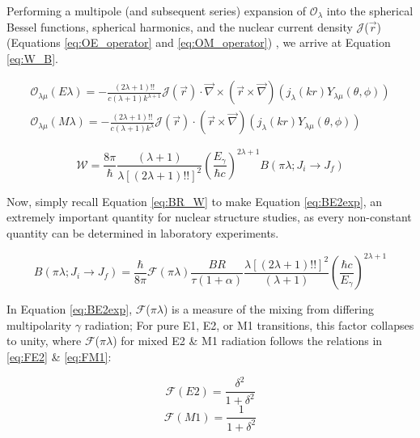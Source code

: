Performing a multipole (and subsequent series) expansion of $\mathcal{O}_{\lambda}$ into the spherical Bessel functions, spherical harmonics, and the nuclear current density $\mathcal{J}$($\vec{r}$) (Equations \ref{eq:OE_operator} and \ref{eq:OM_operator}) \cite{Wong_text}, we arrive at Equation \ref{eq:W_B}.

\begin{align}
  \mathcal{O}_{\lambda\mu}(E\lambda)=-\frac{(2\lambda+1)!!}{c(\lambda+1)k^{\lambda+1}}\mathcal{J}(\vec{r})\cdot\vec{\nabla}\times(\vec{r}\times\vec{\nabla})(j_\lambda(kr)Y_{\lambda\mu}(\theta,\phi))       \label{eq:OE_operator}\\
\mathcal{O}_{\lambda\mu}(M\lambda)=-\frac{(2\lambda+1)!!}{c(\lambda+1)k^{\lambda}}\mathcal{J}(\vec{r})\cdot(\vec{r}\times\vec{\nabla})(j_\lambda(kr)Y_{\lambda\mu}(\theta,\phi))\label{eq:OM_operator}
\end{align}

\begin{equation}\label{eq:W_B}
\mathcal{W}=\frac{8\pi}{\hbar}\frac{(\lambda+1)}{\lambda[(2\lambda+1)!!]^2}\left(\frac{E_\gamma}{\hbar c}\right)^{2\lambda+1}B(\pi\lambda;J_i\rightarrow J_f)
\end{equation}

Now, simply recall Equation \ref{eq:BR_W} to make Equation \ref{eq:BE2exp}, an extremely important quantity for nuclear structure studies, as every non-constant quantity can be determined in laboratory experiments. 

\begin{equation}\label{eq:BE2exp}
B(\pi\lambda; J_i \rightarrow J_f)=\frac{\hbar}{8\pi}\mathcal{F}(\pi\lambda)\frac{BR}{\tau (1+\alpha)}\frac{\lambda[(2\lambda+1)!!]^2}{(\lambda+1)}\left(\frac{\hbar c}{E_\gamma}\right)^{2\lambda+1}
\end{equation}

In Equation \ref{eq:BE2exp}, $\mathcal{F}$($\pi\lambda$) is a measure of the mixing from differing multipolarity $\gamma$ radiation; For pure E1, E2, or M1 transitions, this factor collapses to unity, where $\mathcal{F}$($\pi\lambda$) for mixed E2 \& M1 radiation follows the relations in \ref{eq:FE2} \& \ref{eq:FM1}:

\begin{equation}\label{eq:FE2}
\mathcal{F}(E2)=\frac{\delta^2}{1+\delta^2}
\end{equation}
\begin{equation}\label{eq:FM1}
\mathcal{F}(M1)=\frac{1}{1+\delta^2}
\end{equation}

